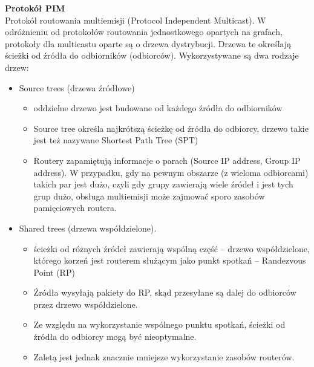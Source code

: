 \documentclass[../main.tex]{subfiles}
\begin{document}
    \textbf{Protokół PIM}\\
    Protokół routowania multiemisji (Protocol Independent Multicast).
    W odróżnieniu od protokołów routowania jednostkowego opartych na grafach,
    protokoły dla multicastu oparte są o drzewa dystrybucji. Drzewa te określają ścieżki od
    źródła do odbiorników (odbiorców).
    Wykorzystywane są dwa rodzaje drzew:
    \begin{itemize}
        \item Source trees (drzewa źródłowe)
        \begin{itemize}
            \item oddzielne drzewo jest budowane
            od każdego źródła do odbiorników
            \item Source tree określa najkrótszą ścieżkę od źródła do
            odbiorcy, drzewo takie jest też nazywane Shortest Path Tree (SPT)
            \item  Routery zapamiętują
            informacje o parach (Source IP address, Group IP address). W przypadku, gdy na pewnym
            obszarze (z wieloma odbiorcami) takich par jest dużo, czyli gdy grupy zawierają wiele źródeł i
            jest tych grup dużo, obsługa multiemisji może zajmować sporo zasobów pamięciowych
            routera.
        \end{itemize}
        \item Shared trees (drzewa współdzielone).
        \begin{itemize}
            \item ścieżki od różnych źródeł zawierają
            wspólną część – drzewo współdzielone, którego korzeń jest routerem służącym jako punkt
            spotkań – Randezvous Point (RP)
            \item  Źródła wysyłają pakiety do RP, skąd przesyłane są dalej do
            odbiorców przez drzewo współdzielone.
            \item Ze względu na wykorzystanie wspólnego punktu
            spotkań, ścieżki od źródła do odbiorcy mogą być nieoptymalne.
            \item Zaletą jest jednak znacznie
            mniejsze wykorzystanie zasobów routerów.
        \end{itemize}
    \end{itemize}
\end{document}

